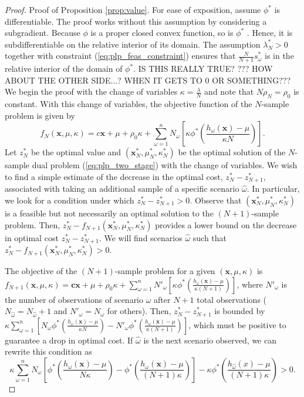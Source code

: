 \documentclass[opre,nonblindrev]{informs3} %
\newcommand{\x}{\mathbf{x}}
\renewcommand{\c}{\mathbf{c}}
\begin{document}
\begin{proof}{\sc Proof of Proposition \ref{prop:value}.}
	For ease of exposition, assume $\phi^*$ is differentiable.
	The proof works without this assumption by considering a subgradient.
	Because $\phi$ is a proper closed convex function, so is $\phi^*$ \citep[Theorem 12.2]{rockafellar_70}.
	Hence, it is subdifferentiable on the relative interior of its domain.  
	The assumption $\lambda^*_N>0$ together with constraint (\ref{eq:plp_feas_constraint}) ensures that $\frac{N}{N+1}s^*_\omega$ is in the relative interior of the domain of $\phi^{*}$.  IS THIS REALLY TRUE? ???  HOW ABOUT THE OTHER SIDE...?  WHEN IT GETS TO 0 OR SOMETHING???  
	We begin the proof with the change of variables $\kappa = \frac{\lambda}{N}$ and note that $N\rho_N = \rho_0$ is constant.	
	With this change of variables, the objective function of the $N$-sample problem is given by
	\[
		f_N(\x,\mu,\kappa) = c\x + \mu + \rho_0 \kappa + \sum_{\omega = 1}^n N_\omega \left[ \kappa \phi^*\left(\frac{h_\omega(\x) - \mu}{\kappa N} \right) \right].
	\]
	Let $z_N^*$ be the optimal value and  $(\x^*_N,\mu^*_N,\kappa^*_N)$ be the optimal solution of the $N$-sample dual problem (\ref{eq:plp_two_stage}) with the change of variables.
	We wish to find a simple estimate of the decrease in the optimal cost, $z_N^* - z_{N+1}^*$, associated with taking an additional sample of a specific scenario $\hat{\omega}$.
In particular, we look for a condition under which $z_N^* - z_{N+1}^* > 0$.	
	Observe that $(\x^*_N,\mu^*_N,\kappa^*_N)$ is a feasible but not necessarily an optimal solution to the $(N+1)$-sample problem.
	Then, $z_N^* - f_{N+1}(\x^*_N,\mu^*_N,\kappa^*_N)$ provides a lower bound on the decrease in optimal cost $z_N^* - z_{N+1}^*$.
	We will find scenarios $\hat{\omega}$ such that $z_N^* - f_{N+1}(\x^*_N,\mu^*_N,\kappa^*_N) > 0$.

	The objective of the $(N+1)$-sample problem for a given $(\x,\mu,\kappa)$ is $ f_{N+1}(\x,\mu,\kappa) = \c\x + \mu + \rho_0 \kappa + \sum_{\omega = 1}^n N'_\omega \left[ \kappa \phi^*\left(\frac{h_\omega(\x) - \mu}{\kappa (N+1)} \right) \right]$,	where $N'_\omega$ is the number of observations of scenario $\omega$ after $N+1$ total observations ($N_{\hat{\omega}}=N_{\hat{\omega}}+1$ and $N'_\omega = N_\omega$ for others).
	Then, $z_N^* - z_{N+1}^*$ is bounded by $\kappa \sum_{\omega=1}^n \left[ N_\omega \phi^*\left(\frac{h_\omega(\x) - \mu}{\kappa N} \right) - N'_\omega \phi^*\left(\frac{h_\omega(\x) - \mu}{\kappa (N+1)} \right) \right]$, which must be positive to guarantee a drop in optimal cost.
	If $\hat{\omega}$ is the next scenario observed, we can rewrite this condition as
	\begin{equation} \label{eq:raw_cond}
		\kappa \sum_{\omega=1}^n N_\omega \left[ \phi^*\left(\frac{h_\omega(\x) - \mu}{N\kappa} \right) - \phi^*\left(\frac{h_\omega(\x) - \mu}{(N+1)\kappa} \right) \right] - \kappa \phi^*\left(\frac{h_{\hat{\omega}}(x) - \mu}{(N+1)\kappa}\right) > 0.
	\end{equation}


\end{proof}
\end{document}
